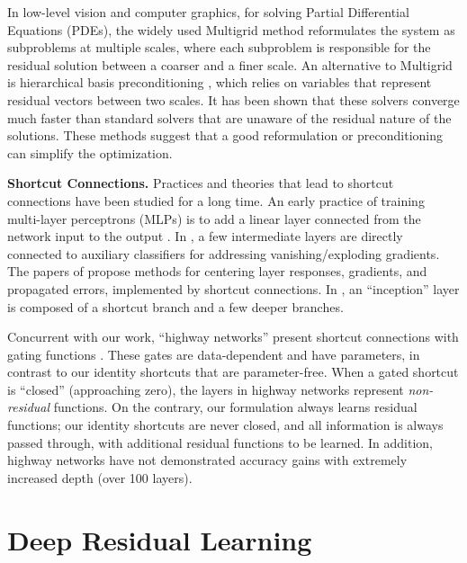 \documentclass{article}
\begin{document}
In low-level vision and computer graphics, for solving Partial Differential Equations (PDEs), the widely used Multigrid method \cite{Briggs2000} reformulates the system as subproblems at multiple scales, where each subproblem is responsible for the residual solution between a coarser and a finer scale. An alternative to Multigrid is hierarchical basis preconditioning \cite{Szeliski1990,Szeliski2006}, which relies on variables that represent residual vectors between two scales. It has been shown \cite{Briggs2000,Szeliski1990,Szeliski2006} that these solvers converge much faster than standard solvers that are unaware of the residual nature of the solutions. These methods suggest that a good reformulation or preconditioning can simplify the optimization.

\vspace{6pt}
\noindent\textbf{Shortcut Connections.}
Practices and theories that lead to shortcut connections \cite{Bishop1995,Ripley1996,Venables1999} have been studied for a long time.
An early practice of training multi-layer perceptrons (MLPs) is to add a linear layer connected from the network input to the output \cite{Ripley1996,Venables1999}. In \cite{Szegedy2015,Lee2014}, a few intermediate layers are directly connected to auxiliary classifiers for addressing vanishing/exploding gradients. The papers of \cite{Schraudolph1998,Schraudolph1998a,Raiko2012,Vatanen2013} propose methods for centering layer responses, gradients, and propagated errors, implemented by shortcut connections. In \cite{Szegedy2015}, an ``inception'' layer is composed of a shortcut branch and a few deeper branches.


Concurrent with our work, ``highway networks'' \cite{Srivastava2015,Srivastava2015a} present shortcut connections with gating functions \cite{Hochreiter1997}. These gates are data-dependent and have parameters, in contrast to our identity shortcuts that are parameter-free. When a gated shortcut is ``closed'' (approaching zero), the layers in highway networks represent \emph{non-residual} functions. On the contrary, our formulation always learns residual functions; our identity shortcuts are never closed, and all information is always passed through, with additional residual functions to be learned. In addition, highway networks have not demonstrated accuracy gains with extremely increased depth (over 100 layers).

\section{Deep Residual Learning}
\end{document}
